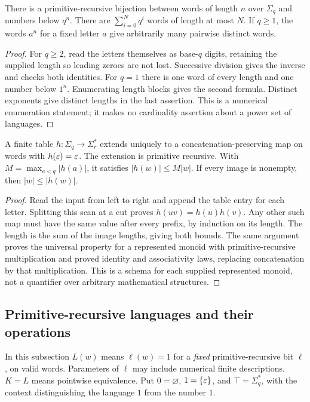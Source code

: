 \begin{theorem}\label{word:count}
There is a primitive-recursive bijection between words of length $n$ over
$\Sigma_q$ and numbers below $q^n$. There are
$\sum_{i=0}^{N}q^i$ words of length at most $N$. If $q\ge1$, the words
$a^n$ for a fixed letter $a$ give arbitrarily many pairwise distinct words.
\end{theorem}
\begin{proof}
For $q\ge2$, read the letters themselves as base-$q$ digits, retaining
the supplied length so leading zeroes are not lost. Successive division
gives the inverse and checks both identities. For $q=1$ there is one word
of every length and one number below $1^n$. Enumerating length blocks
gives the second formula. Distinct exponents give distinct lengths in
the last assertion. This is a numerical enumeration statement; it makes
no cardinality assertion about a power set of languages.
\end{proof}

\begin{theorem}\label{word:hom}
A finite table $h:\Sigma_q\to\Sigma_r^*$ extends uniquely to a
concatenation-preserving map on words with $h(\varepsilon)=\varepsilon$.
The extension is primitive recursive. With
$M=\max_{a<q}|h(a)|$, it satisfies $|h(w)|\le M|w|$.
If every image is nonempty, then $|w|\le|h(w)|$.
\end{theorem}
\begin{proof}
Read the input from left to right and append the table entry for each
letter. Splitting this scan at a cut proves $h(uv)=h(u)h(v)$.
Any other such map must have the same value after every prefix, by
induction on its length. The length is the sum of the image lengths,
giving both bounds. The same argument proves the universal property
for a represented monoid with primitive-recursive multiplication and
proved identity and associativity laws, replacing concatenation by that
multiplication. This is a schema for each supplied represented monoid,
not a quantifier over arbitrary mathematical structures.
\end{proof}

\subsection{Primitive-recursive languages and their operations}

In this subsection $L(w)$ means $\ell(w)=1$ for a \emph{fixed}
primitive-recursive bit $\ell$, on valid words. Parameters of $\ell$ may
include numerical finite descriptions. $K=L$ means pointwise equivalence.
Put $0=\varnothing$, $1=\{\varepsilon\}$, and $\top=\Sigma_q^*$, with the
context distinguishing the language $1$ from the number $1$.

